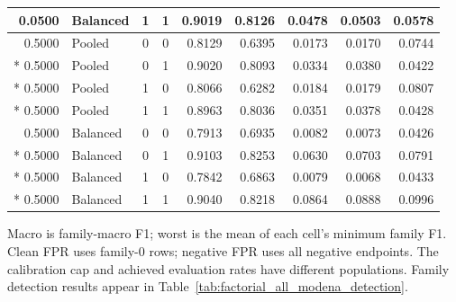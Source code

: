 \begin{longtable}{@{}rlccrrrrr@{}}
0.0500 & Balanced & 1 & 1 & 0.9019 & 0.8126 & 0.0478 & 0.0503 & 0.0578 \\
\midrule
0.5000 & Pooled & 0 & 0 & 0.8129 & 0.6395 & 0.0173 & 0.0170 & 0.0744 \\*
0.5000 & Pooled & 0 & 1 & 0.9020 & 0.8093 & 0.0334 & 0.0380 & 0.0422 \\*
0.5000 & Pooled & 1 & 0 & 0.8066 & 0.6282 & 0.0184 & 0.0179 & 0.0807 \\*
0.5000 & Pooled & 1 & 1 & 0.8963 & 0.8036 & 0.0351 & 0.0378 & 0.0428 \\
\midrule
0.5000 & Balanced & 0 & 0 & 0.7913 & 0.6935 & 0.0082 & 0.0073 & 0.0426 \\*
0.5000 & Balanced & 0 & 1 & 0.9103 & 0.8253 & 0.0630 & 0.0703 & 0.0791 \\*
0.5000 & Balanced & 1 & 0 & 0.7842 & 0.6863 & 0.0079 & 0.0068 & 0.0433 \\*
0.5000 & Balanced & 1 & 1 & 0.9040 & 0.8218 & 0.0864 & 0.0888 & 0.0996 \\
\end{longtable}
\noindent\footnotesize Macro is family-macro F1; worst is the mean of each cell's minimum family F1. Clean FPR uses family-0 rows; negative FPR uses all negative endpoints. The calibration cap and achieved evaluation rates have different populations. Family detection results appear in Table~\ref{tab:factorial_all_modena_detection}.
\par\endgroup
